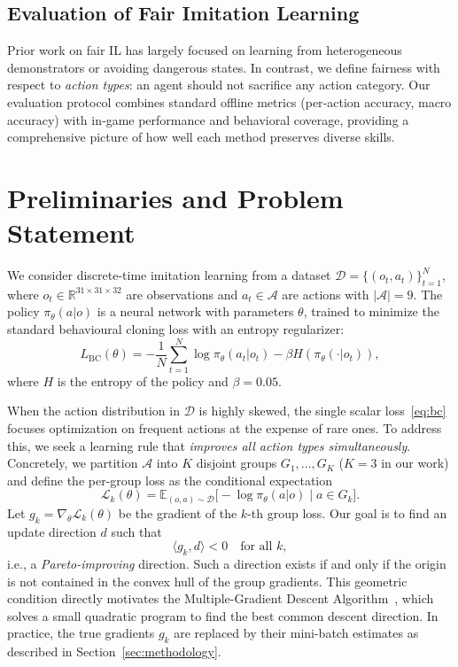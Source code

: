 \documentclass[conference]{IEEEtran}
\begin{document}
\subsection{Evaluation of Fair Imitation Learning}
Prior work on fair IL has largely focused on learning from heterogeneous demonstrators or avoiding dangerous states. In contrast, we define fairness with respect to \emph{action types}: an agent should not sacrifice any action category. Our evaluation protocol combines standard offline metrics (per‑action accuracy, macro accuracy) with in‑game performance and behavioral coverage, providing a comprehensive picture of how well each method preserves diverse skills.

\section{Preliminaries and Problem Statement}
We consider discrete-time imitation learning from a dataset $\mathcal{D} = \{(o_t, a_t)\}_{t=1}^N$, where $o_t \in \mathbb{R}^{31\times31\times32}$ are observations and $a_t \in \mathcal{A}$ are actions with $|\mathcal{A}| = 9$. The policy $\pi_\theta(a|o)$ is a neural network with parameters $\theta$, trained to minimize the standard behavioural cloning loss with an entropy regularizer:
\begin{equation}
L_{\text{BC}}(\theta) = -\frac{1}{N}\sum_{t=1}^N \log \pi_\theta(a_t|o_t) - \beta H(\pi_\theta(\cdot|o_t)),
\label{eq:bc}
\end{equation}
where $H$ is the entropy of the policy and $\beta = 0.05$.

When the action distribution in $\mathcal{D}$ is highly skewed, the single scalar loss~\eqref{eq:bc} focuses optimization on frequent actions at the expense of rare ones. To address this, we seek a learning rule that \emph{improves all action types simultaneously}. Concretely, we partition $\mathcal{A}$ into $K$ disjoint groups $G_1,\dots,G_K$ ($K=3$ in our work) and define the per-group loss as the conditional expectation
\begin{equation}
\mathcal{L}_k(\theta) = \mathbb{E}_{(o,a)\sim\mathcal{D}}\big[-\log \pi_\theta(a|o) \mid a \in G_k\big].
\label{eq:group}
\end{equation}
Let $g_k = \nabla_\theta \mathcal{L}_k(\theta)$ be the gradient of the $k$-th group loss. Our goal is to find an update direction $d$ such that
\[
\langle g_k, d \rangle < 0 \quad \text{for all } k,
\]
i.e., a \emph{Pareto-improving} direction. Such a direction exists if and only if the origin is not contained in the convex hull of the group gradients. This geometric condition directly motivates the Multiple-Gradient Descent Algorithm~\cite{desideri2012multiple}, which solves a small quadratic program to find the best common descent direction. In practice, the true gradients $g_k$ are replaced by their mini-batch estimates as described in Section~\ref{sec:methodology}.
\end{document}
